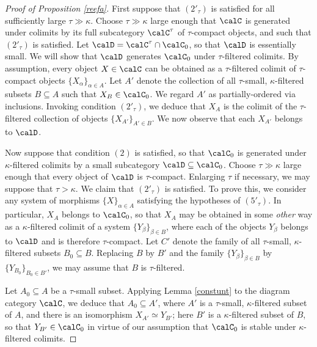 \begin{proof}[Proof of Proposition \ref{reefa}]
First suppose that $(2'_{\tau})$ is satisfied for all sufficiently large $\tau \gg \kappa$. Choose
$\tau \gg \kappa$ large enough that $\calC$ is generated under colimits by its full subcategory $\calC^{\tau}$ of $\tau$-compact objects, and such that $(2'_{\tau})$ is satisfied. Let 
$\calD = \calC^{\tau} \cap \calC_0$, so that $\calD$ is essentially small. We will show that
$\calD$ generates $\calC_0$ under $\tau$-filtered colimits.
By assumption, every object $X \in \calC$ can be obtained as a $\tau$-filtered colimit of $\tau$-compact objects $\{ X_{\alpha} \}_{\alpha \in A}$.
Let $A'$ denote the collection of all
$\tau$-small, $\kappa$-filtered subsets $B \subseteq A$ such that $X_{B} \in \calC_0$. 
We regard $A'$ as partially-ordered via inclusions. Invoking condition $(2'_{\tau})$, we deduce that $X_{A}$ is the colimit of the $\tau$-filtered collection of objects $\{ X_{A'} \}_{A' \in B}$. We now observe that each $X_{A'}$ belongs to $\calD$.

Now suppose that condition $(2)$ is satisfied, so that $\calC_0$ is generated under $\kappa$-filtered colimits by a small subcategory $\calD \subseteq \calC_0$. Choose
$\tau \gg \kappa$ large enough that every object of $\calD$ is $\tau$-compact. Enlarging $\tau$ if necessary, we may suppose that $\tau > \kappa$. We claim that $(2'_{\tau})$ is satisfied.
To prove this, we consider any system of morphisms $\{ X \}_{\alpha \in A}$ satisfying the hypotheses of $(5'_{\tau})$. In particular, $X_A$ belongs to
$\calC_0$, so that $X_A$ may be obtained in some {\em other} way as a $\kappa$-filtered colimit of a system $\{ Y_{\beta}  \}_{\beta \in B}$, where each of the objects $Y_{\beta}$ belongs to $\calD$ and is therefore $\tau$-compact. Let $C'$ denote the family of all $\tau$-small, $\kappa$-filtered subsets $B_0 \subseteq B$. Replacing $B$ by $B'$ and the family
$\{ Y_{\beta} \}_{\beta \in B}$ by
$\{ Y_{B_0} \}_{ B_0 \in B'}$, we may assume that $B$ is $\tau$-filtered.

Let $A_0 \subseteq A$ be a $\tau$-small subset. Applying Lemma \ref{constunt} to the diagram category $\calC$, we deduce that $A_0 \subseteq A'$, where $A'$ is a $\tau$-small, $\kappa$-filtered subset of $A$, and there is an isomorphism
$X_{A'} \simeq Y_{B'}$; here $B'$ is a $\kappa$-filtered subset of $B$, so that $Y_{B'} \in \calC_0$ in virtue of our assumption that $\calC_0$ is stable under $\kappa$-filtered colimits.
\end{proof}

